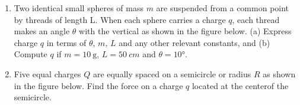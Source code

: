 \documentclass[12pt]{article}
\begin{document}
\begin{enumerate}[leftmargin=15pt]

\item Two identical small spheres of mass $m$ are suspended from a common point
  by threads of length L. When each sphere carries a charge $q$, each thread
  makes an angle $\theta$ with the vertical as shown in the figure below.
  (a) Express charge $q$ in terms of $\theta$, $m$, $L$ and any other relevant
  constants, and (b) Compute $q$ if $m=\SI{10}{\gram}$, $L=\SI{50}{cm}$ and
  $\theta=\ang{10}$.
  
  \vspace{1.35in}
  
\item Five equal charges $Q$ are equally spaced on a semicircle or radius $R$
  as shown in the figure below. Find the force on a charge $q$ located at the
  centerof the semicircle.
  

\end{enumerate}
\end{document}
